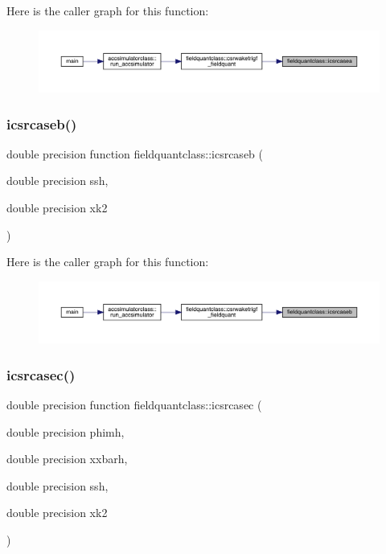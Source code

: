 Here is the caller graph for this function\+:\nopagebreak
\begin{figure}[H]
\begin{center}
\leavevmode
\includegraphics[width=350pt]{namespacefieldquantclass_a7431c26c185c399c546e1ac54043bad4_icgraph}
\end{center}
\end{figure}
\mbox{\label{namespacefieldquantclass_ac6ac81d1607e424c294650bb3f89aa5c}} 
\subsubsection{\texorpdfstring{icsrcaseb()}{icsrcaseb()}}
{\footnotesize\ttfamily double precision function fieldquantclass\+::icsrcaseb (\begin{DoxyParamCaption}\item[{double precision}]{ssh,  }\item[{double precision}]{xk2 }\end{DoxyParamCaption})}

Here is the caller graph for this function\+:\nopagebreak
\begin{figure}[H]
\begin{center}
\leavevmode
\includegraphics[width=350pt]{namespacefieldquantclass_ac6ac81d1607e424c294650bb3f89aa5c_icgraph}
\end{center}
\end{figure}
\mbox{\label{namespacefieldquantclass_a85aac5a4f515439e4263b24518d8c9dc}} 
\subsubsection{\texorpdfstring{icsrcasec()}{icsrcasec()}}
{\footnotesize\ttfamily double precision function fieldquantclass\+::icsrcasec (\begin{DoxyParamCaption}\item[{double precision}]{phimh,  }\item[{double precision}]{xxbarh,  }\item[{double precision}]{ssh,  }\item[{double precision}]{xk2 }\end{DoxyParamCaption})}

